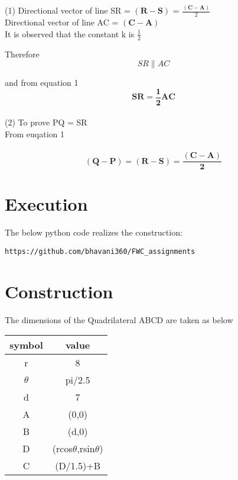 \documentclass[journal,10pt,twocolumn]{article}
\begin{document}
	
(1)  Directional vector of line SR  = $\boldsymbol {(R-S)}$ = $\frac{\boldsymbol{(C-A)}}{2} $\\
Directional vector of line AC  = $\boldsymbol {(C-A)}$\\

It is observed that the constant k is $\frac{1}{2}$

Therefore
\begin{equation}
	SR \parallel AC
\end{equation} 

and from equation 1 
\begin{equation}
	\boldsymbol {SR = \frac{1}{2}AC}    
\end{equation}\\


(2)   To prove PQ = SR\\ 
		From euqation 1\\\\
\begin{equation}
		\boldsymbol{ (Q-P) = (R-S) = \frac{(C-A)}{2}}
\end{equation}
	 



\section{Execution}
The below python code realizes the construction:
\begin{lstlisting}
https://github.com/bhavani360/FWC_assignments
\end{lstlisting}
	
\section*{Construction}
The dimensions of the Quadrilateral ABCD are taken as below\\
{
\setlength\extrarowheight{2pt}
\centering
	\begin{tabular}{|c|c|}
	\hline
	\textbf{symbol}&\textbf{value}\\
	\hline
	r&8\\
	\hline
	$\theta$&pi/2.5\\
	\hline
	d&7\\
	\hline
	A&(0,0)\\
	\hline
	B&(d,0)\\
	\hline
	D&(rcos$\theta$,rsin$\theta$)\\
	\hline
	C&(D/1.5)+B\\
	\hline
\end{tabular}
}
\end{document}
